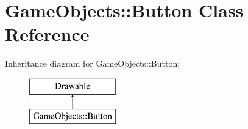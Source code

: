 \hypertarget{class_game_objects_1_1_button}{}\section{Game\+Objects\+::Button Class Reference}
\label{class_game_objects_1_1_button}
Inheritance diagram for Game\+Objects\+::Button\+:\begin{figure}[H]
\begin{center}
\leavevmode
\includegraphics[height=2.000000cm]{class_game_objects_1_1_button}
\end{center}
\end{figure}
